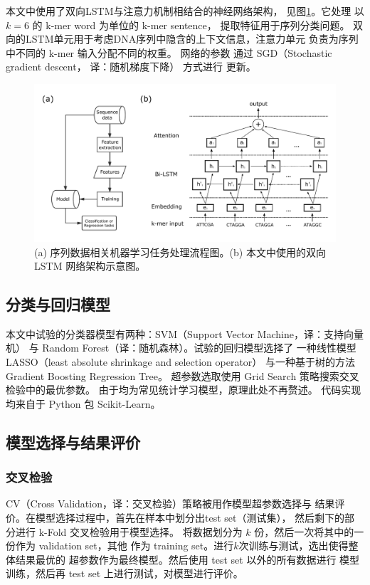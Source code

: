 \documentclass[UTF8]{ctexart}
\begin{document}
  本文中使用了双向LSTM与注意力机制\autocite{}相结合的神经网络架构，
  见图\ref{fig:method}。它处理
  以 $k=6$ 的 k-mer word 为单位的 k-mer sentence， 提取特征用于序列分类问题。
  双向的LSTM单元用于考虑DNA序列中隐含的上下文信息，注意力单元
  负责为序列中不同的 k-mer 输入分配不同的权重。 网络的参数
  通过 SGD（Stochastic gradient descent， 译：随机梯度下降） 方式进行
  更新。

  \begin{figure}[h!]
  \centering
  \includegraphics[width=1\textwidth]{imgs/method.pdf}
  \caption{(a) 序列数据相关机器学习任务处理流程图。(b) 本文中使用的双向 LSTM 网络架构示意图。}
  \label{fig:method}
  \end{figure}

  \subsection{分类与回归模型}
  本文中试验的分类器模型有两种：SVM（Support Vector Machine，译：支持向量机）
  与 Random Forest（译：随机森林）。试验的回归模型选择了
  一种线性模型 LASSO（least absolute shrinkage and selection operator）
  与一种基于树的方法 Gradient Boosting Regression Tree。
  超参数选取使用 Grid Search 策略搜索交叉检验中的最优参数。
  由于均为常见统计学习模型，原理此处不再赘述。
  代码实现均来自于 Python 包 Scikit-Learn。

  \subsection{模型选择与结果评价}
  \subsubsection{交叉检验}
  CV（Cross Validation，译：交叉检验）策略被用作模型超参数选择与
  结果评价。在模型选择过程中，首先在样本中划分出test set（测试集），
  然后剩下的部分进行 k-Fold 交叉检验用于模型选择。
  将数据划分为 $k$ 份，然后一次将其中的一份作为 validation set，其他
  作为 training set。进行$k$次训练与测试，选出使得整体结果最优的
  超参数作为最终模型。然后使用 test set 以外的所有数据进行
  模型训练，然后再 test set 上进行测试，对模型进行评价。 
\end{document}
